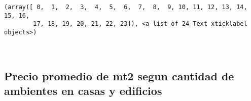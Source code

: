 \documentclass[11pt]{article}
\newcommand{\prompt}[4]{
        \llap{{\color{#2}[#3]: #4}}\vspace{-1.25em}
    }
\begin{document}
            \begin{tcolorbox}[breakable, boxrule=.5pt, size=fbox, pad at break*=1mm, opacityfill=0]
\prompt{Out}{outcolor}{513}{\hspace{3.5pt}}
\begin{Verbatim}[commandchars=\\\{\}]
(array([ 0,  1,  2,  3,  4,  5,  6,  7,  8,  9, 10, 11, 12, 13, 14, 15, 16,
        17, 18, 19, 20, 21, 22, 23]), <a list of 24 Text xticklabel objects>)
\end{Verbatim}
\end{tcolorbox}
        
    \begin{center}
    \end{center}
    { \hspace*{\fill} \\}
    
    \subsection{Precio promedio de mt2 segun cantidad de ambientes en casas
y
edificios}\label{precio-promedio-de-mt2-segun-cantidad-de-ambientes-en-casas-y-edificios}
\end{document}

